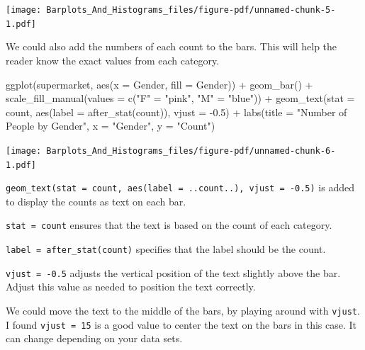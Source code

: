 \documentclass[
  letterpaper,
  DIV=11,
  numbers=noendperiod]{scrreprt}
\newenvironment{Shaded}{\begin{snugshade}}{\end{snugshade}}
\newcommand{\AttributeTok}[1]{\textcolor[rgb]{0.40,0.45,0.13}{#1}}
\newcommand{\FloatTok}[1]{\textcolor[rgb]{0.68,0.00,0.00}{#1}}
\newcommand{\FunctionTok}[1]{\textcolor[rgb]{0.28,0.35,0.67}{#1}}
\newcommand{\NormalTok}[1]{\textcolor[rgb]{0.00,0.23,0.31}{#1}}
\newcommand{\OtherTok}[1]{\textcolor[rgb]{0.00,0.23,0.31}{#1}}
\newcommand{\SpecialCharTok}[1]{\textcolor[rgb]{0.37,0.37,0.37}{#1}}
\newcommand{\StringTok}[1]{\textcolor[rgb]{0.13,0.47,0.30}{#1}}
\begin{document}
\texttt{[image: Barplots\_And\_Histograms\_files/figure-pdf/unnamed-chunk-5-1.pdf]}

We could also add the numbers of each count to the bars. This will help
the reader know the exact values from each category.

\begin{Shaded}
\begin{Highlighting}[]
\FunctionTok{ggplot}\NormalTok{(supermarket, }\FunctionTok{aes}\NormalTok{(}\AttributeTok{x =}\NormalTok{ Gender, }\AttributeTok{fill =}\NormalTok{ Gender)) }\SpecialCharTok{+}
  \FunctionTok{geom\_bar}\NormalTok{() }\SpecialCharTok{+}
  \FunctionTok{scale\_fill\_manual}\NormalTok{(}\AttributeTok{values =} \FunctionTok{c}\NormalTok{(}\StringTok{"F"} \OtherTok{=} \StringTok{"pink"}\NormalTok{, }\StringTok{"M"} \OtherTok{=} \StringTok{"blue"}\NormalTok{)) }\SpecialCharTok{+}
  \FunctionTok{geom\_text}\NormalTok{(}\AttributeTok{stat =} \StringTok{\textquotesingle{}count\textquotesingle{}}\NormalTok{, }\FunctionTok{aes}\NormalTok{(}\AttributeTok{label =} \FunctionTok{after\_stat}\NormalTok{(count)), }\AttributeTok{vjust =} \SpecialCharTok{{-}}\FloatTok{0.5}\NormalTok{) }\SpecialCharTok{+}
  \FunctionTok{labs}\NormalTok{(}\AttributeTok{title =} \StringTok{"Number of People by Gender"}\NormalTok{,}
       \AttributeTok{x =} \StringTok{"Gender"}\NormalTok{,}
       \AttributeTok{y =} \StringTok{"Count"}\NormalTok{)}
\end{Highlighting}
\end{Shaded}

\texttt{[image: Barplots\_And\_Histograms\_files/figure-pdf/unnamed-chunk-6-1.pdf]}

\texttt{geom\_text(stat\ =\ \textquotesingle{}count\textquotesingle{},\ aes(label\ =\ ..count..),\ vjust\ =\ -0.5)}
is added to display the counts as text on each bar.

\texttt{stat\ =\ \textquotesingle{}count\textquotesingle{}} ensures that
the text is based on the count of each category.

\texttt{label\ =\ after\_stat(count)} specifies that the label should be
the count.

\texttt{vjust\ =\ -0.5} adjusts the vertical position of the text
slightly above the bar. Adjust this value as needed to position the text
correctly.

We could move the text to the middle of the bars, by playing around with
\texttt{vjust}. I found \texttt{vjust\ =\ 15} is a good value to center
the text on the bars in this case. It can change depending on your data
sets.
\end{document}
